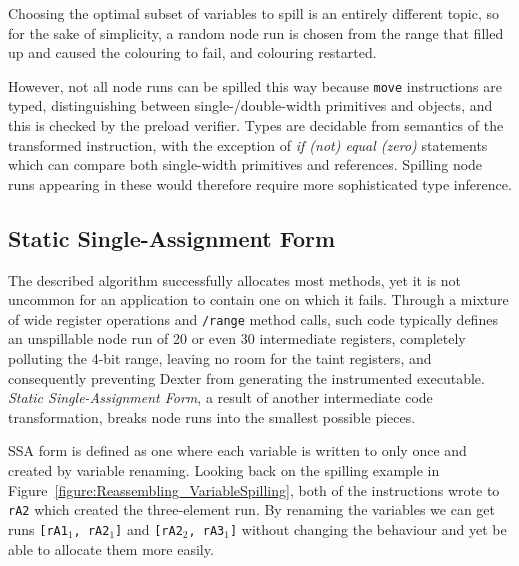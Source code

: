 \documentclass[12pt,twoside,notitlepage]{report}
\begin{document}
Choosing the optimal subset of variables to spill is an entirely different topic, so for the sake of simplicity, a random node run is chosen from the range that filled up and caused the colouring to fail, and colouring restarted.

However, not all node runs can be spilled this way because \texttt{move} instructions are typed, distinguishing between single-/double-width primitives and objects, and this is checked by the preload verifier. Types are decidable from semantics of the transformed instruction, with the exception of \emph{if (not) equal (zero)} statements which can compare both single-width primitives and references. Spilling node runs appearing in these would therefore require more sophisticated type inference.

\subsection{Static Single-Assignment Form}

The described algorithm successfully allocates most methods, yet it is not uncommon for an application to contain one on which it fails. Through a mixture of wide register operations and \texttt{/range} method calls, such code typically defines an unspillable node run of 20 or even 30 intermediate registers, completely polluting the 4-bit range, leaving no room for the taint registers, and consequently preventing Dexter from generating the instrumented executable. \emph{Static Single-Assignment Form}, a result of another intermediate code transformation, breaks node runs into the smallest possible pieces.

SSA form is defined as one where each variable is written to only once and created by variable renaming. Looking back on the spilling example in Figure~\ref{figure:Reassembling_VariableSpilling}, both of the instructions wrote to \texttt{rA2} which created the three-element run. By renaming the variables we can get runs \texttt{{[}rA1$_1$, rA2$_1$]} and \texttt{{[}rA2$_2$, rA3$_1$]} without changing the behaviour and yet be able to allocate them more easily.
\end{document}
